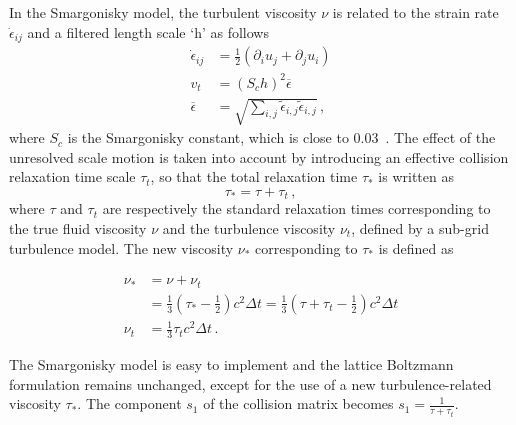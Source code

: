In the Smargonisky model, the turbulent viscosity $\nu$ is related to the 
strain rate $\dot{\epsilon}_{ij}$ and a filtered length scale `h' as follows
%
\begin{align}
\dot{\epsilon}_{ij} & = \frac{1}{2}(\partial_i u_j + \partial_j u_i) \\
\mathit{v}_{\mathit{t}} & = (\mathit{S}_{c}\mathit{h})^{2}\overline{\epsilon} 
\\
\overline{\epsilon} & =  
\sqrt{\sum\limits_{\mathit{i,j}}{\tilde{\epsilon}_{\mathit{i,j}}\tilde{\epsilon}_{\mathit{i,j}}}}\,,
\end{align}
%
\noindent where $\mathit{S}_{c}$ is the Smargonisky constant, which is close 
to 0.03~\citep{yu2005}. 
%
The effect of the unresolved scale motion is taken into account by introducing 
an effective collision relaxation time scale $\tau_{t}$, so that the total 
relaxation time $\tau_{*}$ is written as
%
\begin{equation}
\tau_{*}=\tau + \tau_{t}\,,
\end{equation} 
%
\noindent where $\tau$ and $\tau_{t}$ are respectively the standard relaxation 
times 
corresponding to the true fluid viscosity $\nu$ and the turbulence 
viscosity $\nu_{\mathit{t}}$, defined by a sub-grid turbulence model. 
The new viscosity $\nu_{*}$ corresponding to $\tau_{*}$ is defined as

\begin{align}
\nu_{*} & 
=\nu+\nu_{\mathit{t}} \nonumber \\
	& =\frac{1}{3}(\tau_{*}-\frac{1}{2})
\mathit{c}^{2} \Delta \mathit{t} 
=\frac{1}{3}(\tau+\tau_{t}-\frac{1}{2})\mathit{c}^{2} \Delta \mathit{t}  \\
\nu_{\mathit{t}} & =\frac{1}{3}\tau_{\mathit{t}}\mathit{c}^{2} \Delta 
\textit{t} \,.
\end{align} 

The Smargonisky model is easy to implement and the lattice Boltzmann 
formulation remains unchanged, except for the use of a new turbulence-related 
viscosity $\tau_{*}$. The component $s_1$ of the collision matrix becomes $s_1 
= \frac{1}{\tau+\tau_t}$.

